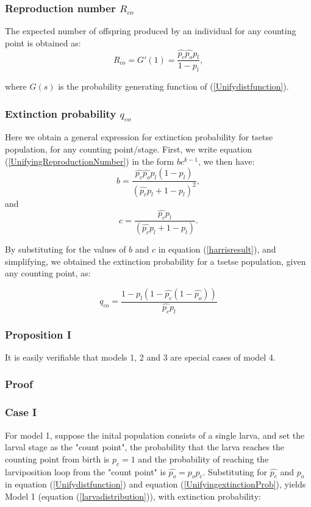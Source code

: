 \documentclass[smallextended]{svjour3}
\begin{document}
\subsubsection{\bf Reproduction number $R_{co}$}
The expected number of offspring produced by an individual for any counting point is obtained as:  
\begin{equation}
\label{UnifyingReproductionNumber}
R_{co} = G'(1) = \frac{\hat{p_c}\hat{p_o}p_{l}}{1-p_{l}},
\end{equation}  

where $G(s)$ is the probability generating function of (\ref{Unifydistfunction}).

\subsubsection{\bf Extinction probability $q_{co}$}
Here we obtain a general expression for extinction probability for tsetse population, for any counting point/stage.  First,  we write equation (\ref{UnifyingReproductionNumber}) in the form $bc^{k-1}$, we then have:
$$ b = \frac{\hat{p_c}\hat{p_o}p_{l}(1-p_{l})}{(\hat{p_c}p_{l} + 1 - p_{l})^2}, $$
and 
$$ c = \frac{\hat{p_c}p_{l}}{(\hat{p_c}p_{l} + 1 - p_{l})}. $$


By substituting for the values of  $b$ and $c$ in equation (\ref{harrisresult}), and simplifying, we obtained the extinction probability for a tsetse population, given any counting point, as:

\begin{equation}
\label{UnifyingextinctionProb}	
q_{co} = \frac{1-p_{l}(1-\hat{p_c}(1-\hat{p_o}))}{\hat{p_c}p_{l}} 
\end{equation}  

\subsubsection{\bf Proposition I}

It is easily verifiable that models 1, 2 and 3 are special cases of model 4. 

\subsubsection*{Proof}

\subsubsection*{Case I}
For model 1, suppose the inital population consists of a single larva, and  set the larval stage as the "count point", the probability that the larva reaches the counting point from birth is $\hat{p_c}=1$ and the probability of reaching the larviposition loop from the "count point" is $\hat{p_o} = p_{o}p_{c}$. Substituting for $\hat{p_c}$ and $\hat{p_o}$ in equation (\ref{Unifydistfunction}) and equation (\ref{UnifyingextinctionProb}), yields Model 1 (equation (\ref{larvadistribution})), with extinction probability:
\end{document}
